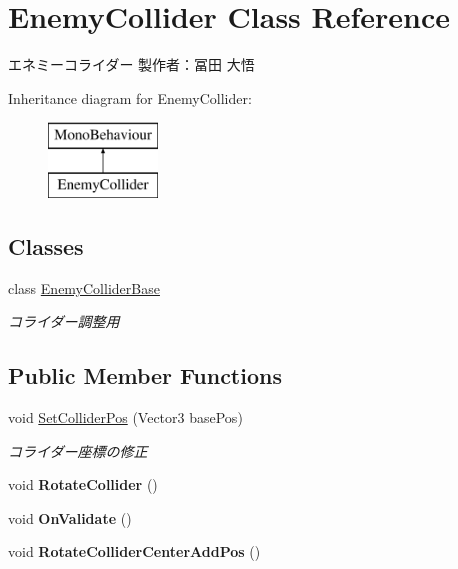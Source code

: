 \hypertarget{class_enemy_collider}{}\section{Enemy\+Collider Class Reference}
\label{class_enemy_collider}


エネミーコライダー 製作者：冨田 大悟  


Inheritance diagram for Enemy\+Collider\+:\begin{figure}[H]
\begin{center}
\leavevmode
\includegraphics[height=2.000000cm]{class_enemy_collider}
\end{center}
\end{figure}
\subsection*{Classes}
\begin{DoxyCompactItemize}
\item 
class \hyperlink{class_enemy_collider_1_1_enemy_collider_base}{Enemy\+Collider\+Base}
\begin{DoxyCompactList}\small\item\em コライダー調整用 \end{DoxyCompactList}\end{DoxyCompactItemize}
\subsection*{Public Member Functions}
\begin{DoxyCompactItemize}
\item 
void \hyperlink{class_enemy_collider_ab984266faa7320cb7b4bf0ce508eceb9}{Set\+Collider\+Pos} (Vector3 base\+Pos)
\begin{DoxyCompactList}\small\item\em コライダー座標の修正 \end{DoxyCompactList}\item 
\mbox{\label{class_enemy_collider_a65dad0540bd70d157fffb1789bdc5e3e}} 
void {\bfseries Rotate\+Collider} ()
\item 
\mbox{\label{class_enemy_collider_a10586dade0134de14d27e73331f70049}} 
void {\bfseries On\+Validate} ()
\item 
\mbox{\label{class_enemy_collider_a014505d0090d1acd5433c0f6af7b9239}} 
void {\bfseries Rotate\+Collider\+Center\+Add\+Pos} ()
\end{DoxyCompactItemize}
